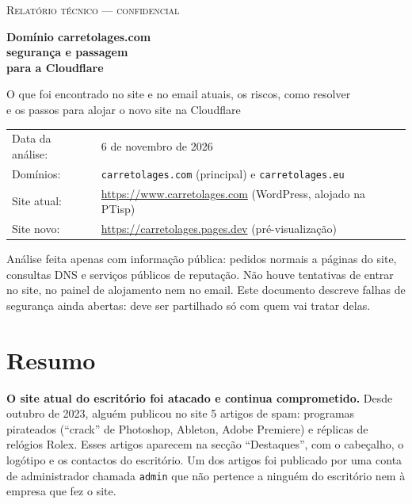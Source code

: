 \documentclass[11pt,a4paper]{article}
\begin{document}
\begin{titlepage}
  \vspace*{3cm}
  {\color{bronze}\small\scshape Relatório técnico --- confidencial}\\[0.6em]
  {\raggedright\Huge\bfseries\color{verde700} Domínio carretolages.com\\[0.2em] segurança e passagem\\ para a Cloudflare\par}\vspace{1.2em}
  {\large O que foi encontrado no site e no email atuais, os riscos, como resolver\\ e os passos para alojar o novo site na Cloudflare}\\[3em]
  \begin{tabular}{@{}ll}
    Data da análise: & 6 de novembro de 2026 \\
    Domínios: & \texttt{carretolages.com} (principal) e \texttt{carretolages.eu} \\
    Site atual: & \url{https://www.carretolages.com} (WordPress, alojado na PTisp) \\
    Site novo: & \url{https://carretolages.pages.dev} (pré-visualização) \\
  \end{tabular}
  \vfill
  {\small\color{tintasuave} Análise feita apenas com informação pública: pedidos normais a páginas do site,
  consultas DNS e serviços públicos de reputação. Não houve tentativas de entrar no site, no painel de
  alojamento nem no email. Este documento descreve falhas de segurança ainda abertas: deve ser partilhado
  só com quem vai tratar delas.}
\end{titlepage}

\tableofcontents
\clearpage

\section{Resumo}

\textbf{O site atual do escritório foi atacado e continua comprometido.} Desde outubro de 2023, alguém
publicou no site 5 artigos de spam: programas pirateados (``crack'' de Photoshop, Ableton, Adobe Premiere)
e réplicas de relógios Rolex. Esses artigos aparecem na secção ``Destaques'', com o cabeçalho, o logótipo e
os contactos do escritório. Um dos artigos foi publicado por uma conta de administrador chamada
\texttt{admin} que não pertence a ninguém do escritório nem à empresa que fez o site.
\end{document}
